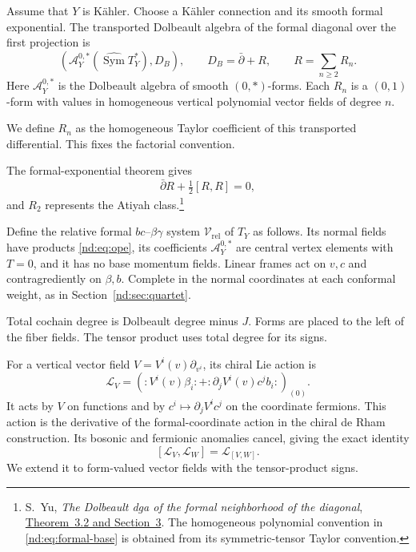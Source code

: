 Assume that $Y$ is Kähler. Choose a Kähler connection and its smooth
formal exponential. The transported Dolbeault algebra of the formal
diagonal over the first projection is
\begin{equation}\label{nd:eq:formal-base}
 \left(\mathcal A_Y^{0,*}
       (\widehat{\operatorname{Sym}}T_Y^*),D_B\right),
 \qquad D_B=\bar\partial+R,\qquad R=\sum_{n\geq2}R_n.
\end{equation}
Here $\mathcal A_Y^{0,*}$ is the Dolbeault algebra of smooth
$(0,*)$-forms. Each $R_n$ is a $(0,1)$-form with values in
homogeneous vertical polynomial vector fields of degree $n$.

We define $R_n$ as the homogeneous Taylor coefficient of this
transported differential. This fixes the factorial convention.

The formal-exponential theorem gives
\begin{equation}\label{nd:eq:MC}
 \bar\partial R+\tfrac12[R,R]=0,
\end{equation}
and $R_2$ represents the Atiyah class.\footnote{
S.~Yu, \emph{The Dolbeault dga of the formal neighborhood of the
diagonal}, \href{https://arxiv.org/abs/1211.1567}{Theorem~3.2 and
Section~3}. The homogeneous polynomial convention in
\eqref{nd:eq:formal-base} is obtained from its symmetric-tensor
Taylor convention.}

Define the relative formal $bc$--$\beta\gamma$ system
$\mathcal V_{\mathrm{rel}}$ of $T_Y$ as follows. Its normal fields
have products \eqref{nd:eq:ope}, its coefficients
$\mathcal A_Y^{0,*}$ are central vertex elements with $T=0$, and
it has no base momentum fields. Linear frames act on $v,c$ and
contragrediently on $\beta,b$. Complete in the normal coordinates
at each conformal weight, as in Section~\ref{nd:sec:quartet}.

Total cochain degree is Dolbeault degree minus $J$. Forms are placed
to the left of the fiber fields. The tensor product uses total
degree for its signs.

For a vertical vector field $V=V^i(v)\partial_{v^i}$, its chiral
Lie action is
\begin{equation}\label{nd:eq:lie}
 \mathcal L_V=
 \left(:V^i(v)\beta_i:
       +:\partial_jV^i(v)c^jb_i:\right)_{(0)}.
\end{equation}
It acts by $V$ on functions and by
$c^i\mapsto\partial_jV^i c^j$ on the coordinate fermions.
This action is the derivative of the formal-coordinate action in
the chiral de Rham construction. Its bosonic and fermionic anomalies
cancel, giving the exact identity
\begin{equation}\label{nd:eq:lie-action}
 [\mathcal L_V,\mathcal L_W]=\mathcal L_{[V,W]}.
\end{equation}
We extend it to form-valued vector fields with the tensor-product signs.

